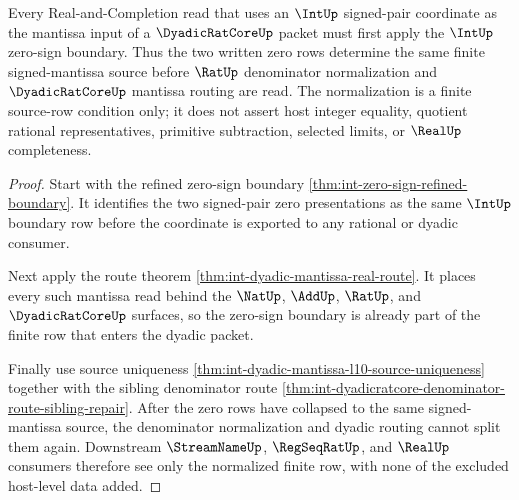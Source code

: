 \begin{theorem}
\label{thm:int-dyadic-mantissa-zero-sign-normalization}
Every Real-and-Completion read that uses an $\IntUp$ signed-pair coordinate as
the mantissa input of a $\DyadicRatCoreUp$ packet must first apply the
$\IntUp$ zero-sign boundary. Thus the two written zero rows determine the same
finite signed-mantissa source before $\RatUp$ denominator normalization and
$\DyadicRatCoreUp$ mantissa routing are read. The normalization is a finite
source-row condition only; it does not assert host integer equality, quotient
rational representatives, primitive subtraction, selected limits, or
$\RealUp$ completeness.
\end{theorem}
\begin{proof}
Start with the refined zero-sign boundary
\autoref{thm:int-zero-sign-refined-boundary}. It identifies the two signed-pair
zero presentations as the same $\IntUp$ boundary row before the coordinate is
exported to any rational or dyadic consumer.

Next apply the route theorem
\autoref{thm:int-dyadic-mantissa-real-route}. It places every such mantissa read
behind the $\NatUp$, $\AddUp$, $\RatUp$, and $\DyadicRatCoreUp$ surfaces, so the
zero-sign boundary is already part of the finite row that enters the dyadic
packet.

Finally use source uniqueness
\autoref{thm:int-dyadic-mantissa-l10-source-uniqueness} together with the
sibling denominator route
\autoref{thm:int-dyadicratcore-denominator-route-sibling-repair}. After the
zero rows have collapsed to the same signed-mantissa source, the denominator
normalization and dyadic routing cannot split them again. Downstream
$\StreamNameUp$, $\RegSeqRatUp$, and $\RealUp$ consumers therefore see only the
normalized finite row, with none of the excluded host-level data added.
\end{proof}


